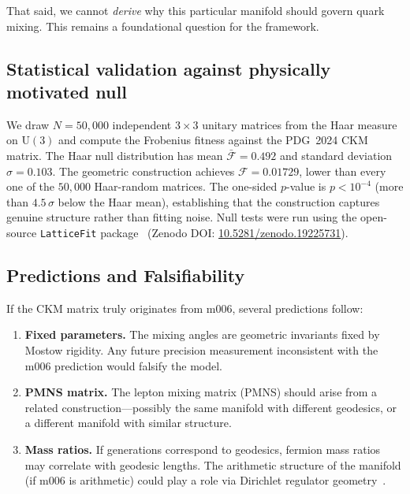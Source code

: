 \documentclass[11pt,a4paper]{article}
\begin{document}
That said, we cannot \emph{derive} why this particular manifold should 
govern quark mixing. This remains a foundational question for the 
framework.


\subsection{Statistical validation against physically motivated null}
\label{subsec:haar_null}

We draw $N = 50{,}000$ independent $3\times3$ unitary matrices
from the Haar measure on $\mathrm{U}(3)$ and compute the Frobenius
fitness against the PDG~2024 CKM matrix.
The Haar null distribution has mean $\bar{\mathcal{F}} = 0.492$
and standard deviation $\sigma = 0.103$.
The geometric construction achieves $\mathcal{F} = 0.01729$,
lower than every one of the $50{,}000$ Haar-random matrices.
The one-sided $p$-value is $p < 10^{-4}$ (more than $4.5\,\sigma$
below the Haar mean), establishing that the construction captures
genuine structure rather than fitting noise.
Null tests were run using the open-source \texttt{LatticeFit} package~\cite{Gentry:LatticeFit} (Zenodo DOI: \href{https://doi.org/10.5281/zenodo.19225731}{10.5281/zenodo.19225731}).

\subsection{Predictions and Falsifiability}
\label{subsec:predictions}

If the CKM matrix truly originates from m006, several predictions follow:

\begin{enumerate}
\item \textbf{Fixed parameters.} The mixing angles are geometric 
invariants fixed by Mostow rigidity. Any future precision 
measurement inconsistent with the m006 prediction would falsify the 
model.

\item \textbf{PMNS matrix.} The lepton mixing matrix (PMNS) should 
arise from a related construction---possibly the same manifold with 
different geodesics, or a different manifold with similar structure.

\item \textbf{Mass ratios.} If generations correspond to geodesics, 
fermion mass ratios may correlate with geodesic lengths. The arithmetic 
structure of the manifold (if m006 is arithmetic) could play a role 
via Dirichlet regulator geometry~\cite{Neukirch1999}.
\end{enumerate}
\end{document}
